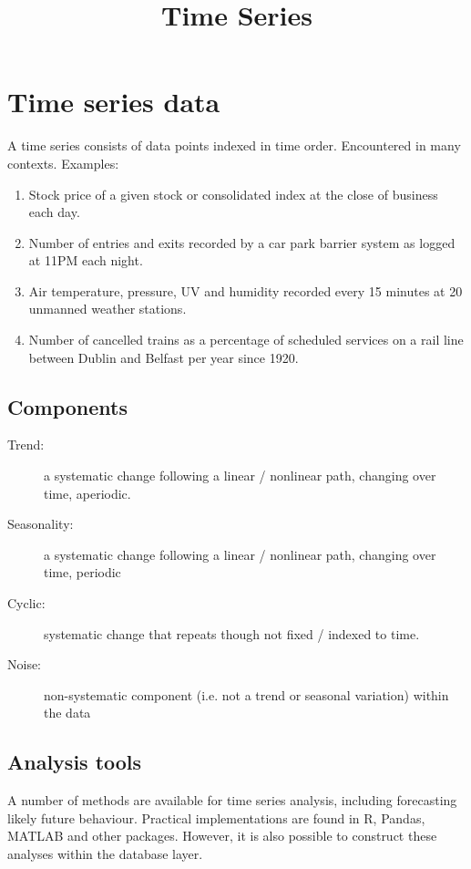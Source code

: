 \documentclass{pgnotes}
\title{Time Series}
\begin{document}
\maketitle

\section{Time series data}

A time series consists of data points indexed in time order.
Encountered in many contexts.
Examples: 

\begin{enumerate}
\item Stock price of a given stock or consolidated index at the close of business each day.
\item Number of entries and exits recorded by a car park barrier system as logged at 11PM each night.
\item Air temperature, pressure, UV and humidity recorded every 15 minutes at 20 unmanned weather stations. 
\item Number of cancelled trains as a percentage of scheduled services on a rail line between Dublin and Belfast per year since 1920. 
\end{enumerate}

\subsection{Components}

\begin{description}
\item[Trend:] a systematic change following a linear / nonlinear path, changing over time, aperiodic.
\item[Seasonality:] a systematic change following a linear / nonlinear path, changing over time, periodic
\item[Cyclic:] systematic change that repeats though not fixed / indexed to time. 
\item[Noise:] non-systematic component (i.e. not a trend or seasonal variation) within the data
\end{description}

\subsection{Analysis tools}

A number of methods are available for time series analysis, including forecasting likely future behaviour.
Practical implementations are found in R, Pandas, MATLAB and other packages.
However, it is also possible to construct these analyses within the database layer. 
\end{document}
